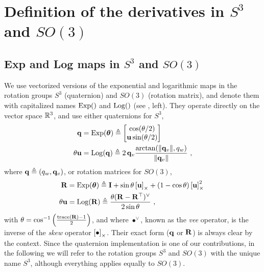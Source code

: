 
\section{Definition of the derivatives in $S^3$ and $SO(3)$}
\label{sec:derivatives_SO3}


\subsection{Exp and Log maps in $S^3$ and $SO(3)$}

We use vectorized versions of the exponential and logarithmic maps in the rotation groups $S^3$ (quaternion) and $SO(3)$ (rotation matrix), and denote them with capitalized names $\operatorname*{Exp}()$ and $\operatorname*{Log}()$ (see , left). They operate directly on the vector space ${\mathbb R}^3$, and use either quaternions for $S^3$,
%
\begin{subequations}
\begin{align}
{\bf q}
&= \operatorname*{Exp}({{\bm \theta}}) \triangleq \begin{bmatrix}
\cos(\theta/2) \\ {\bf u}\sin(\theta/2)
\end{bmatrix}\\ 
\theta{\bf u} &= \operatorname*{Log}({\bf q}) \triangleq 2\,{{\bf q}_v}\frac{\arctan({{\left\|{{\bf q}_v}\right\|},q_w})}{{\left\|{{\bf q}_v}\right\|}}
~,
\end{align}
\end{subequations}
%
where ${\bf q}\triangleq(q_w,{{\bf q}_v})$, or rotation matrices for $SO(3)$, 
%
\begin{subequations}
\begin{align}
{\bf R}
&= \operatorname*{Exp}({{\bm \theta}}) \triangleq {\bf I} + \sin\theta\left[{\bf u}\right]_\times + (1-\cos\theta)\left[{\bf u}\right]_\times^2~ \label{equ:rodrigues} \\ 
\theta{\bf u} &= \operatorname*{Log}({\bf R}) \triangleq \frac{\theta({\bf R}-{\bf R}^{\top})^\vee}{2\sin\theta} 
~,
\end{align}
\end{subequations}
%
with $\theta=\cos^{-1}\left(\frac{\operatorname*{trace}({\bf R})-1}{2}\right)$,
and where $\bullet^\vee$, known as the \emph{vee} operator, is the inverse of the \emph{skew} operator $\left[\bullet\right]_\times$. 
Their exact form (${\bf q}$ or ${\bf R}$) is always clear by the context.
Since the quaternion implementation is one of our contributions, in the following we will refer to the rotation groups $S^3$ and $SO(3)$ with the unique name $S^3$, although everything applies equally to $SO(3)$. 




